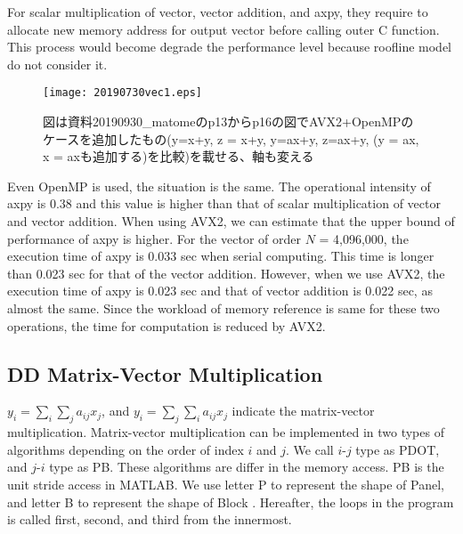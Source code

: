 \documentclass{IOS-Book-Article}
\begin{document}
For scalar multiplication of vector, vector addition, and axpy, they require to allocate new memory address for output vector before calling outer C function. This process would become degrade the performance level because roofline model do not consider it.
\begin{figure}[htbp]
  \begin{center}
    \texttt{[image: 20190730vec1.eps]}
    \caption{図は資料20190930\_matomeのp13からp16の図でAVX2+OpenMPのケースを追加したもの(y=x+y, z = x+y, y=ax+y, z=ax+y, (y = ax, x = axも追加する)を比較)を載せる、軸も変える}
    \label{xd}
  \end{center}
\end{figure}

Even OpenMP is used, the situation is the same. The operational intensity of axpy is 0.38 and this value is higher than that of scalar multiplication of vector and vector addition. When using AVX2, we can estimate that the upper bound of performance of axpy is higher. For the vector of order $N$ = 4,096,000, the execution time of axpy is 0.033 sec when serial computing. This time is longer than 0.023 sec for that of the vector addition. However, when we use AVX2, the execution time of axpy is 0.023 sec and that of vector addition is 0.022 sec, as almost the same. Since the workload of memory reference is same for these two operations, the time for computation is reduced by AVX2.



\subsection{DD Matrix-Vector Multiplication}
$y_{i} = \sum _i\sum _j a_{ij}x_{j}$, and $y_{i} = \sum _j\sum _i a_{ij}x_{j}$ 
indicate the matrix-vector multiplication. 
Matrix-vector multiplication can be implemented in 
two types of algorithms depending on the order of index $i$ and $j$. We call $i$-$j$ type as PDOT, and $j$-$i$ type as PB.
These algorithms are differ in the memory access. PB is the unit stride access in MATLAB.
We use letter P to represent the shape of Panel, and letter B to represent the shape of Block \cite{goto}. 
Hereafter, the loops in the program is called first, second, and third from the innermost.
\end{document}
